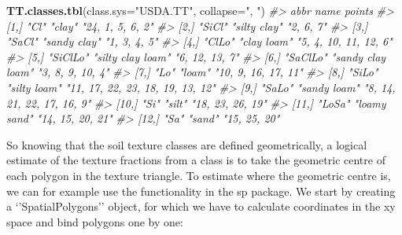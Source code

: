 \documentclass[graybox,natbib,nospthms,UStrade]{svmono}
\newenvironment{Shaded}{\begin{snugshade}}{\end{snugshade}}
\newcommand{\CommentTok}[1]{\textcolor[rgb]{0.37,0.37,0.37}{\textit{#1}}}
\newcommand{\DataTypeTok}[1]{\textcolor[rgb]{0.27,0.27,0.27}{#1}}
\newcommand{\KeywordTok}[1]{\textcolor[rgb]{0.27,0.27,0.27}{\textbf{#1}}}
\newcommand{\NormalTok}[1]{#1}
\newcommand{\StringTok}[1]{\textcolor[rgb]{0.5,0.5,0.5}{#1}}
\begin{document}
\begin{Shaded}
\begin{Highlighting}[]
\KeywordTok{TT.classes.tbl}\NormalTok{(}\DataTypeTok{class.sys=}\StringTok{"USDA.TT"}\NormalTok{, }\DataTypeTok{collapse=}\StringTok{", "}\NormalTok{)}
\CommentTok{#>       abbr     name              points                          }
\CommentTok{#>  [1,] "Cl"     "clay"            "24, 1, 5, 6, 2"                }
\CommentTok{#>  [2,] "SiCl"   "silty clay"      "2, 6, 7"                       }
\CommentTok{#>  [3,] "SaCl"   "sandy clay"      "1, 3, 4, 5"                    }
\CommentTok{#>  [4,] "ClLo"   "clay loam"       "5, 4, 10, 11, 12, 6"           }
\CommentTok{#>  [5,] "SiClLo" "silty clay loam" "6, 12, 13, 7"                  }
\CommentTok{#>  [6,] "SaClLo" "sandy clay loam" "3, 8, 9, 10, 4"                }
\CommentTok{#>  [7,] "Lo"     "loam"            "10, 9, 16, 17, 11"             }
\CommentTok{#>  [8,] "SiLo"   "silty loam"      "11, 17, 22, 23, 18, 19, 13, 12"}
\CommentTok{#>  [9,] "SaLo"   "sandy loam"      "8, 14, 21, 22, 17, 16, 9"      }
\CommentTok{#> [10,] "Si"     "silt"            "18, 23, 26, 19"                }
\CommentTok{#> [11,] "LoSa"   "loamy sand"      "14, 15, 20, 21"                }
\CommentTok{#> [12,] "Sa"     "sand"            "15, 25, 20"}
\end{Highlighting}
\end{Shaded}

So knowing that the soil texture classes are defined geometrically, a logical estimate of the texture fractions from a class is to take the geometric centre of each polygon in the texture triangle. To estimate where the geometric centre is, we can for example use the functionality in the sp package. We start by creating a `'SpatialPolygons'' object, for which we have to calculate coordinates in the xy space and bind polygons one by one:
\end{document}
